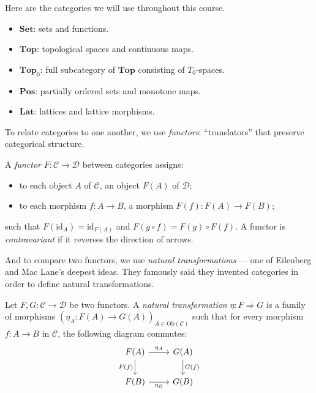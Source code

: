 Here are the categories we will use throughout this course.

\begin{example}
\begin{itemize}
  \item $\mathbf{Set}$: sets and functions.
  \item $\mathbf{Top}$: topological spaces and continuous maps.
  \item $\mathbf{Top}_0$: full subcategory of $\mathbf{Top}$ consisting of $T_0$-spaces.
  \item $\mathbf{Pos}$: partially ordered sets and monotone maps.
  \item $\mathbf{Lat}$: lattices and lattice morphisms.
\end{itemize}
\end{example}

To relate categories to one another, we use \emph{functors}: ``translators''
that preserve categorical structure.

\begin{definition}[Functor]
A \emph{functor} $F\colon \mathcal{C} \to \mathcal{D}$ between categories assigns:
\begin{itemize}
  \item to each object $A$ of $\mathcal{C}$, an object $F(A)$ of $\mathcal{D}$;
  \item to each morphism $f\colon A \to B$, a morphism $F(f)\colon F(A) \to F(B)$;
\end{itemize}
such that $F(\mathrm{id}_A) = \mathrm{id}_{F(A)}$ and $F(g \circ f) = F(g) \circ F(f)$.
A functor is \emph{contravariant} if it reverses the direction of arrows.
\end{definition}

And to compare two functors, we use \emph{natural transformations} --- one
of Eilenberg and Mac Lane's deepest ideas. They famously said they invented
categories in order to define natural transformations.

\begin{definition}
Let $F, G\colon \mathcal{C} \to \mathcal{D}$ be two functors. A \emph{natural
transformation} $\eta\colon F \Rightarrow G$ is a family of morphisms
$(\eta_A\colon F(A) \to G(A))_{A \in \mathrm{Ob}(\mathcal{C})}$ such that for every
morphism $f\colon A \to B$ in $\mathcal{C}$, the following diagram commutes:
\[
\begin{tikzcd}
F(A) \arrow[r, "\eta_A"] \arrow[d, "F(f)"'] & G(A) \arrow[d, "G(f)"] \\
F(B) \arrow[r, "\eta_B"'] & G(B)
\end{tikzcd}
\]
\end{definition}

